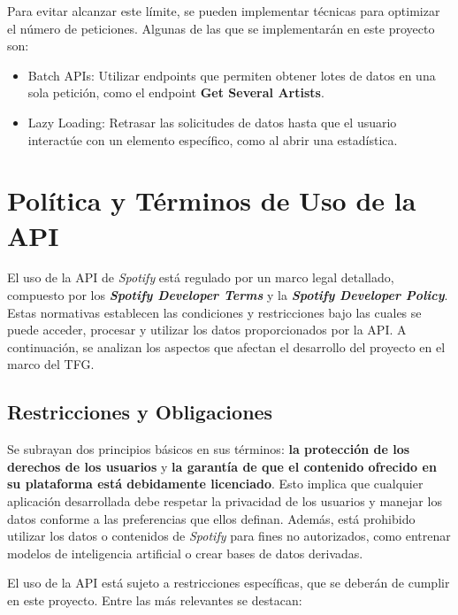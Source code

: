 \newpage

Para evitar alcanzar este límite, se pueden implementar técnicas para optimizar el número de peticiones. Algunas de las que se implementarán en este proyecto son:

\begin{itemize}
    \item Batch APIs: Utilizar endpoints que permiten obtener lotes de datos en una sola petición, como el endpoint \textbf{Get Several Artists}.
    \item Lazy Loading: Retrasar las solicitudes de datos hasta que el usuario interactúe con un elemento específico, como al abrir una estadística.
\end{itemize}

\section{Política y Términos de Uso de la API}

El uso de la API de \textit{Spotify} está regulado por un marco legal detallado, compuesto por los \textit{\textbf{Spotify Developer Terms}} y la \textit{\textbf{Spotify Developer Policy}}. Estas normativas establecen las condiciones y restricciones bajo las cuales se puede acceder, procesar y utilizar los datos proporcionados por la API. A continuación, se analizan los aspectos que afectan el desarrollo del proyecto en el marco del TFG.

\subsection{Restricciones y Obligaciones}

Se subrayan dos principios básicos en sus términos: \textbf{la protección de los derechos de los usuarios} y \textbf{la garantía de que el contenido ofrecido en su plataforma está debidamente licenciado}. Esto implica que cualquier aplicación desarrollada debe respetar la privacidad de los usuarios y manejar los datos conforme a las preferencias que ellos definan. Además, está prohibido utilizar los datos o contenidos de \textit{Spotify} para fines no autorizados, como entrenar modelos de inteligencia artificial o crear bases de datos derivadas.

El uso de la API está sujeto a restricciones específicas, que se deberán de cumplir en este proyecto. Entre las más relevantes se destacan:

